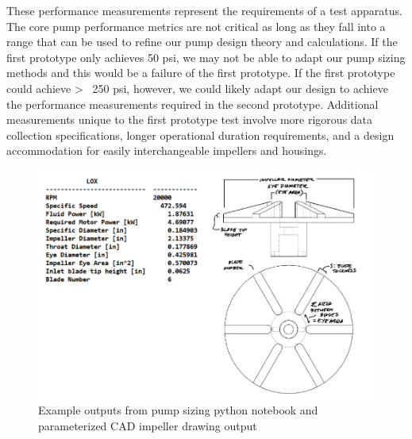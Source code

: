 \documentclass[11pt,twoside,a4paper,openright]{report}
\begin{document}
	These performance measurements represent the requirements of a test apparatus. The core pump performance metrics are not critical as long as they fall into a range that can be used to refine our pump design theory and calculations. If the first prototype only achieves 50 psi, we may not be able to adapt our pump sizing methods and this would be a failure of the first prototype. If the first prototype could achieve > ~250 psi, however, we could likely adapt our design to achieve the performance measurements required in the second prototype. Additional measurements unique to the first prototype test involve more rigorous data collection specifications, longer operational duration requirements, and a design accommodation for  easily interchangeable impellers and housings.\par

\begin{figure}[!h]
\includegraphics[width=\textwidth]{example_pump.png}
\caption{Example outputs from pump sizing python notebook and parameterized CAD impeller drawing output
}
\end{figure}



\newpage
{}
\newpage

\newpage
\end{document}

